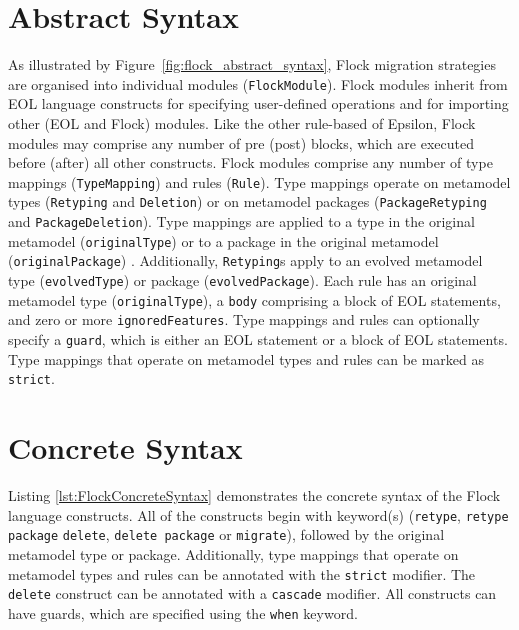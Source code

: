 \section{Abstract Syntax}

As illustrated by Figure~\ref{fig:flock_abstract_syntax}, Flock migration strategies are organised into individual modules (\texttt{Flo\-ckMo\-du\-le}). Flock modules inherit from EOL language constructs for specifying user-defined operations and for importing other (EOL and Flock) modules. Like the other rule-based of Epsilon, Flock modules may comprise any number of pre (post) blocks, which are executed before (after) all other constructs. Flock modules comprise any number of type mappings (\texttt{Ty\-peMa\-pp\-i\-ng}) and rules (\texttt{Ru\-le}). Type mappings operate on metamodel types (\texttt{Rety\-pi\-ng} and \texttt{De\-le\-ti\-on}) or on metamodel packages (\texttt{Pa\-ck\-a\-geRety\-pi\-ng} and \texttt{Pa\-ck\-a\-geDe\-le\-ti\-on}). Type mappings are applied to a type in the original metamodel (\texttt{or\-ig\-in\-alTy\-pe}) or to a package in the original metamodel (\texttt{or\-ig\-in\-alPa\-ck\-a\-ge}) . Additionally, \texttt{Rety\-pi\-ng}s apply to an evolved metamodel type (\texttt{ev\-ol\-vedTy\-pe}) or package (\texttt{ev\-ol\-vedPa\-ck\-a\-ge}). Each rule has an original metamodel type (\texttt{or\-ig\-in\-alTy\-pe}), a \texttt{bo\-dy} comprising a block of EOL statements, and zero or more \texttt{ig\-no\-r\-edFe\-at\-ur\-es}. Type mappings and rules can optionally specify a \texttt{gu\-ard}, which is either an EOL statement or a block of EOL statements. Type mappings that operate on metamodel types and rules can be marked as \texttt{str\-ict}.

\section{Concrete Syntax}

Listing \ref{lst:FlockConcreteSyntax} demonstrates the concrete syntax of the Flock language constructs. All of the constructs begin with keyword(s) (\texttt{retype}, \texttt{retype package} \texttt{delete}, \texttt{delete package} or \texttt{migrate}), followed by the original metamodel type or package. Additionally, type mappings that operate on metamodel types and rules can be annotated with the \texttt{strict} modifier. The \texttt{delete} construct can be annotated with a \texttt{cascade} modifier. All constructs can have guards, which are specified using the \texttt{when} keyword.

